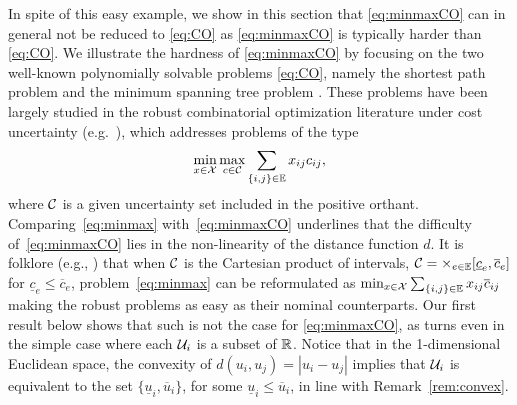 \documentclass[12pt]{article}
\newcommand{\blue}[1]{{\color{black}#1}}
\begin{document}
In spite of this easy example, we show in this section that \ref{eq:minmaxCO} can in general not be reduced to \ref{eq:CO} as \ref{eq:minmaxCO} is typically harder than \ref{eq:CO}. We illustrate the hardness of \ref{eq:minmaxCO} by focusing on the two well-known polynomially solvable problems \ref{eq:CO}, namely the shortest path problem \SP and the minimum spanning tree problem \MST. These problems have been largely studied in the robust combinatorial optimization literature under cost uncertainty (e.g.~\cite{kasperski2009approximability,YamanKP01}), \blue{which addresses problems of the type
\begin{equation}
\label{eq:minmax}
\min_{x\in \mathcal{X}} \max_{c\in\mathcal{C}}\sum_{\{i,j\}\in \mathbb{E}} x_{ij}c_{ij},
\end{equation}
where $\mathcal{C}$} is a given uncertainty set included in the positive orthant. \blue{Comparing~\ref{eq:minmax} with~\ref{eq:minmaxCO} underlines that the difficulty of~\ref{eq:minmaxCO} lies in the non-linearity of the distance function $d$.}
 It is folklore (e.g., \cite{AissiBV09}) that when $\mathcal{C}$ is the Cartesian product of intervals, $\mathcal{C}=\times_{e \in \mathbb{E}}[\underline{c}_e,\overline{c}_e]$ for $\underline{c}_e \leq \overline{c}_e$, problem~\ref{eq:minmax} can be reformulated as $\min_{x\in \mathcal{X}} \sum_{\{i,j\}\in \mathbb{E}} x_{ij}\overline{c}_{ij}$ making the robust problems as easy as their nominal counterparts. Our first result below shows that such is not the case for \ref{eq:minmaxCO}, as \SP turns \NPH even in the simple case where each $\mathcal{U}_i$ is a subset of $\mathbb{R}$. Notice that in the 1-dimensional Euclidean space, the convexity of $d(u_i,u_j)=| u_i - u_j|$ implies that $\mathcal{U}_i$ is equivalent to the set $\{\underline{u}_i,\overline{u}_i\}$, for some $\underline{u}_i\leq \overline{u}_i$, \blue{in line with Remark~\ref{rem:convex}.}%
\end{document}
